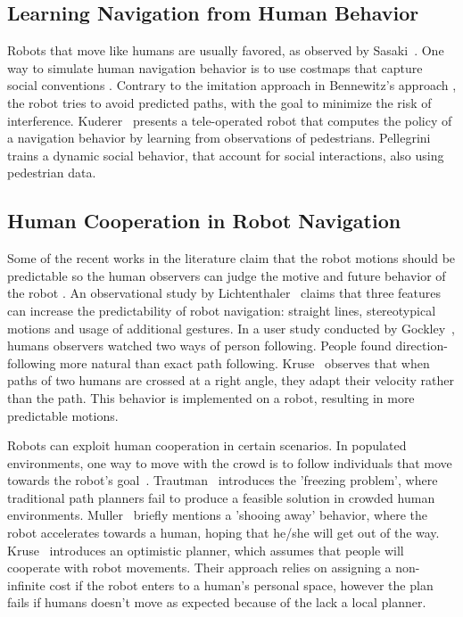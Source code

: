 \subsection{Learning Navigation from Human Behavior}

Robots that move like humans are usually favored, as observed by Sasaki~\cite{sasaki2006human}. One way to simulate human navigation behavior is to use costmaps that capture social conventions \cite{scandolo2011anthropomorphic,luber2012socially}. Contrary to the imitation approach in Bennewitz's approach \cite{bennewitz2005learning}, the robot tries to avoid predicted paths, with the goal to minimize the risk of interference. Kuderer~\cite{kuderer2013teaching} presents a tele-operated robot that computes the policy of a navigation behavior by learning from observations of pedestrians. Pellegrini~\cite{pellegrini2009you} trains a dynamic social behavior, that account for social interactions, also using pedestrian data.

\subsection{Human Cooperation in Robot Navigation}

Some of the recent works in the literature claim that the robot motions should be predictable so the human observers can judge the motive and future behavior of the robot \cite{dragan2013legibility}. An observational study by Lichtenthaler~\cite{lichtenthaler2013towards} claims that three features can increase the predictability of robot navigation: straight lines, stereotypical motions and usage of additional gestures. In a user study conducted by Gockley~\cite{gockley2007natural}, humans observers watched two ways of person following. People found direction-following more natural than exact path following. Kruse~\cite{kruse2012legible} observes that when paths of two humans are crossed at a right angle, they adapt their velocity rather than the path. This behavior is implemented on a robot, resulting in more predictable motions. 

Robots can exploit human cooperation in certain scenarios. In populated environments, one way to move with the crowd is to follow individuals that move towards the robot's goal~\cite{stein2012robot,muller2008socially}. Trautman~\cite{trautman2010unfreezing} introduces the 'freezing problem', where traditional path planners fail to produce a feasible solution in crowded human environments. Muller~\cite{muller2008socially} briefly mentions a 'shooing away' behavior, where the robot accelerates towards a human, hoping that he/she will get out of the way. Kruse~\cite{kruse2010exploiting} introduces an optimistic planner, which assumes that people will cooperate with robot movements. Their approach relies on assigning a non-infinite cost if the robot enters to a human's personal space, however the plan fails if humans doesn't move as expected because of the lack a local planner.

